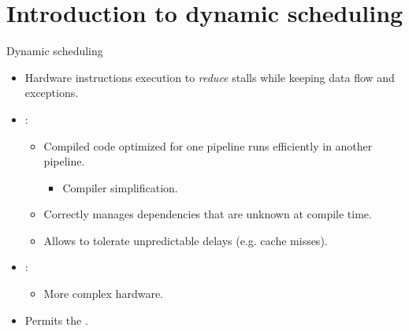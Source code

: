 \section{Introduction to dynamic scheduling}

\begin{frame}[t]{Dynamic scheduling}
\begin{itemize}
  \item Hardware  instructions execution to \emph{reduce} stalls
        while keeping data flow and exceptions.

  \item {}:
    \begin{itemize}
      \item Compiled code optimized for one pipeline runs efficiently in another pipeline.
        \begin{itemize}
          \item Compiler simplification.
        \end{itemize}
      \item Correctly manages dependencies that are unknown at compile time.
      \item Allows to tolerate unpredictable delays (e.g. cache misses).
    \end{itemize}

  \item {}:
    \begin{itemize}
      \item More complex hardware.
    \end{itemize}

  \item Permits the .

\end{itemize}
\end{frame}

